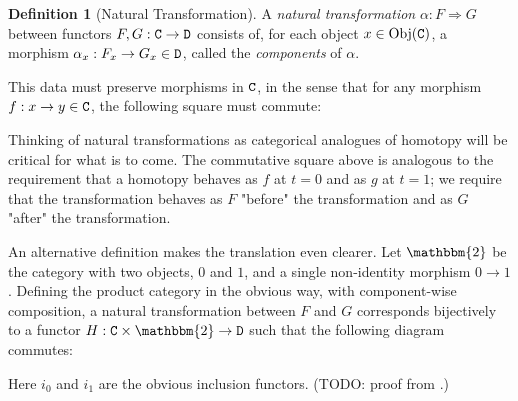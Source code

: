 \documentclass[11 pt]{amsart}
\theoremstyle{plain}   %
\theoremstyle{definition}
\newtheorem{defn}{Definition}[section]
\theoremstyle{remark}
\numberwithin{equation}{section}
\def\nat{\Rightarrow}
\newcommand{\cat}[1]{{\normalfont\texttt{#1}}}
\newcommand{\Obj}[1]{\text{Obj}(\cat{#1})}
\begin{document}
\begin{defn}[Natural Transformation]
	A \emph{natural transformation} $\alpha: F\nat G$ between
	functors $F,G:\cat{C}\rightarrow\cat{D}$ consists of, for each
	object $x\in\Obj{C}$, a morphism $\alpha_x: F_x\rightarrow G_x\in \cat{D}$,
	called the \emph{components} of $\alpha$.

	This data must preserve morphisms in $\cat{C}$, in the sense that for any
	morphism $f: x\rightarrow y\in\cat{C}$, the following square must commute:
	\begin{figure}[H]
		\centering
	\end{figure}
\end{defn}

Thinking of natural transformations as categorical analogues of homotopy will be
critical for what is to come. The commutative square above is analogous to the
requirement that a homotopy behaves as $f$ at $t=0$ and as $g$ at $t=1$; we
require that the transformation behaves as $F$ "before" the transformation and
as $G$ "after" the transformation.

An alternative definition makes the translation even clearer. Let $\mathbbm{2}$
be the category with two objects, $0$ and $1$, and a single non-identity
morphism $0\rightarrow 1$. Defining the product category in the obvious way,
with component-wise composition, a natural transformation between $F$ and $G$
corresponds bijectively to a functor $H:
	\cat{C}\times\mathbbm{2}\rightarrow\cat{D}$ such that the following diagram
commutes:

\begin{figure}[H]
	\centering
\end{figure}

Here $i_0$ and $i_1$ are the obvious inclusion functors. (TODO: proof from
\cite[Lemma 1.5.1]{Riehl}.)
\end{document}
